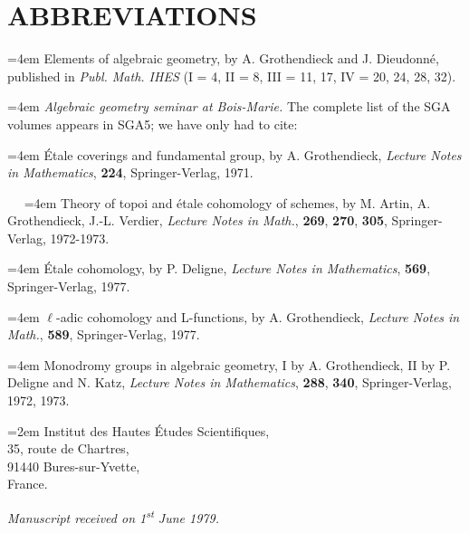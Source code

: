 \documentclass[11pt,leqno]{article}
\newcommand{\Page}[1]{\ifvmode\noindent\else\unskip\ \fi{\footnotesize\textcolor{gray}{[p.\,#1]}}\ \ignorespaces}
\begin{document}
\section*{ABBREVIATIONS}

{\small
\noindent\hangindent=4em
Elements of algebraic geometry, by A. Grothendieck and J. Dieudonné, published in \textit{Publ. Math. IHES} (I = 4, II = 8, III = 11, 17, IV = 20, 24, 28, 32).

\noindent\hangindent=4em
\textit{Algebraic geometry seminar at Bois-Marie.} The complete list of the SGA volumes appears in SGA5; we have only had to cite:

\noindent\hangindent=4em
Étale coverings and fundamental group, by A. Grothendieck, \textit{Lecture Notes in Mathematics}, \textbf{224}, Springer-Verlag, 1971.

\Page{252}
\noindent\hangindent=4em
Theory of topoi and étale cohomology of schemes, by M. Artin, A. Grothendieck, J.-L. Verdier, \textit{Lecture Notes in Math.}, \textbf{269}, \textbf{270}, \textbf{305}, Springer-Verlag, 1972-1973.

\noindent\hangindent=4em
Étale cohomology, by P. Deligne, \textit{Lecture Notes in Mathematics}, \textbf{569}, Springer-Verlag, 1977.

\noindent\hangindent=4em
\(\ell\)-adic cohomology and L-functions, by A. Grothendieck, \textit{Lecture Notes in Math.}, \textbf{589}, Springer-Verlag, 1977.

\noindent\hangindent=4em
Monodromy groups in algebraic geometry, I by A. Grothendieck, II by P. Deligne and N. Katz, \textit{Lecture Notes in Mathematics}, \textbf{288}, \textbf{340}, Springer-Verlag, 1972, 1973.
\par}

\bigskip
{\leftskip=2em
\noindent Institut des Hautes Études Scientifiques,\\
35, route de Chartres,\\
91440 Bures-sur-Yvette,\\
France.
\par}

\bigskip
\begin{flushright}
\textit{Manuscript received on 1\textsuperscript{\textup{st}} June 1979.}
\end{flushright}
\end{document}
